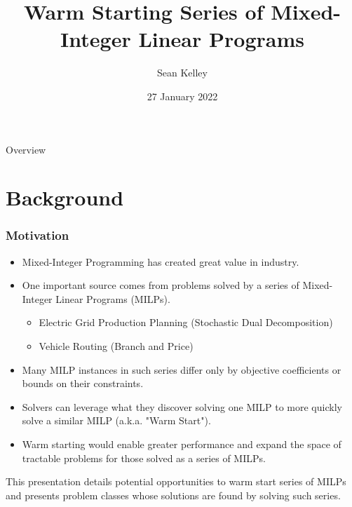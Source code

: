 \documentclass{beamer}
\title[Warm Starting Series of MILP's]{Warm Starting Series of Mixed-Integer Linear Programs}
\author{Sean Kelley} %
\date{27 January 2022} %
\begin{document}
	
	\begin{frame}
		\titlepage %
	\end{frame}

	\begin{frame}{Overview}
		\tableofcontents
	\end{frame}

	\section{Background}
	
	\begin{frame}[t]
		\frametitle{Motivation}
		\small
		\begin{itemize}
			\item Mixed-Integer Programming has created great value in industry.
			\item One important source comes from problems solved by a series of Mixed-Integer Linear Programs (MILPs).
			\begin{itemize}
				\item Electric Grid Production Planning (Stochastic Dual Decomposition)
				\item Vehicle Routing (Branch and Price)
			\end{itemize}
			\item Many MILP instances in such series differ only by objective coefficients or bounds on their constraints.
			\item Solvers can leverage what they discover solving one MILP to more quickly solve a similar MILP (a.k.a. "Warm Start").
			\item Warm starting would enable greater performance and expand the space of tractable problems for those solved as a series of MILPs.
		\end{itemize}
		\vspace{-.25cm}
		\begin{block}{}
			This presentation details potential opportunities to warm start series of MILPs and presents problem classes whose solutions are found by solving such series.
		\end{block}
		\normalsize
	\end{frame}
\end{document}
